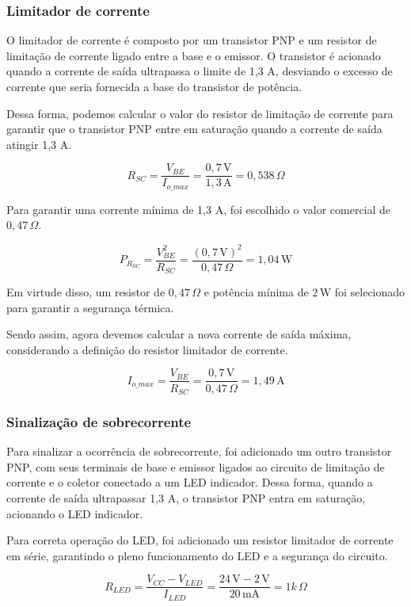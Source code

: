 \subsubsection*{Limitador de corrente}

O limitador de corrente é composto por um transistor PNP e um resistor de limitação de corrente ligado entre a base e o emissor. O transistor é acionado quando a corrente de saída ultrapassa o limite de 1,3 A, desviando o excesso de corrente que seria fornecida a base do transistor de potência.

Dessa forma, podemos calcular o valor do resistor de limitação de corrente para garantir que o transistor PNP entre em saturação quando a corrente de saída atingir 1,3 A.


\[
R_{SC} = \frac{V_{BE}}{I_{o\_max}} = \frac{0,7 \, \text{V}}{1,3 \, \text{A}} = 0,538 \, \Omega
\]

Para garantir uma corrente mínima de 1,3 A, foi escolhido o valor comercial de \(0,47 \, \Omega\).

\[
P_{R_{SC}} = \frac{V_{BE}^2}{R_{SC}} = \frac{(0,7 \, \text{V})^2}{0,47 \, \Omega} = 1,04 \, \text{W}
\]

Em virtude disso, um resistor de \(0,47 \, \Omega\) e potência mínima de \(2 \, \text{W}\) foi selecionado para garantir a segurança térmica.

Sendo assim, agora devemos calcular a nova corrente de saída máxima, considerando a definição do resistor limitador de corrente.

\[
I_{o\_max} = \frac{V_{BE}}{R_{SC}} = \frac{0,7 \, \text{V}}{0,47 \, \Omega} = 1,49 \, \text{A}
\]

\subsubsection*{Sinalização de sobrecorrente}

Para sinalizar a ocorrência de sobrecorrente, foi adicionado um outro transistor PNP, com seus terminais de base e emissor ligados ao circuito de limitação de corrente e o coletor conectado a um LED indicador. Dessa forma, quando a corrente de saída ultrapassar 1,3 A, o transistor PNP entra em saturação, acionando o LED indicador.

Para correta operação do LED, foi adicionado um resistor limitador de corrente em série, garantindo o pleno funcionamento do LED e a segurança do circuito.

\[
R_{LED} = \frac{V_{CC} - V_{LED}}{I_{LED}} = \frac{24 \, \text{V} - 2 \, \text{V}}{20 \, \text{mA}} = 1k \, \Omega
\]

